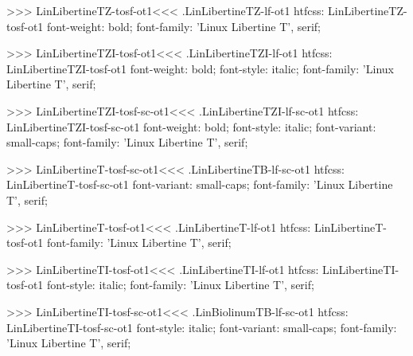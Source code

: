 {{{{{{{>>>
\<LinLibertineTZ-tosf-ot1\><<<
.LinLibertineTZ-lf-ot1
htfcss:  LinLibertineTZ-tosf-ot1  font-weight: bold; font-family: 'Linux Libertine T', serif;

>>>
\<LinLibertineTZI-tosf-ot1\><<<
.LinLibertineTZI-lf-ot1
htfcss:  LinLibertineTZI-tosf-ot1  font-weight: bold; font-style: italic; font-family: 'Linux Libertine T', serif;

>>>
\<LinLibertineTZI-tosf-sc-ot1\><<<
.LinLibertineTZI-lf-sc-ot1
htfcss:  LinLibertineTZI-tosf-sc-ot1  font-weight: bold; font-style: italic; font-variant: small-caps; font-family: 'Linux Libertine T', serif;

>>>
\<LinLibertineT-tosf-sc-ot1\><<<
.LinLibertineTB-lf-sc-ot1
htfcss:  LinLibertineT-tosf-sc-ot1  font-variant: small-caps; font-family: 'Linux Libertine T', serif;

>>>
\<LinLibertineT-tosf-ot1\><<<
.LinLibertineT-lf-ot1
htfcss:  LinLibertineT-tosf-ot1  font-family: 'Linux Libertine T', serif;

>>>
\<LinLibertineTI-tosf-ot1\><<<
.LinLibertineTI-lf-ot1
htfcss:  LinLibertineTI-tosf-ot1  font-style: italic; font-family: 'Linux Libertine T', serif;

>>>
\<LinLibertineTI-tosf-sc-ot1\><<<
.LinBiolinumTB-lf-sc-ot1
htfcss:  LinLibertineTI-tosf-sc-ot1  font-style: italic; font-variant: small-caps; font-family: 'Linux Libertine T', serif;

}}}}}}}
